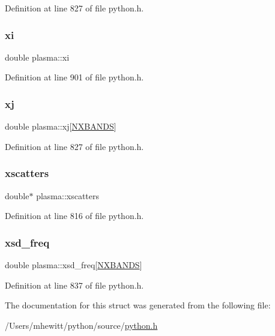 Definition at line 827 of file python.\+h.

\mbox{\label{structplasma_af8986403a916d5a9f4330ae70aa5e798}} 
\subsubsection{\texorpdfstring{xi}{xi}}
{\footnotesize\ttfamily double plasma\+::xi}



Definition at line 901 of file python.\+h.

\mbox{\label{structplasma_abded068048bfaf274478a65b26388ed5}} 
\subsubsection{\texorpdfstring{xj}{xj}}
{\footnotesize\ttfamily double plasma\+::xj\mbox{[}\hyperlink{python_8h_ac640b7fc429348ef2f6781704d3c5163}{N\+X\+B\+A\+N\+DS}\mbox{]}}



Definition at line 827 of file python.\+h.

\mbox{\label{structplasma_aba12a0eea107e923bad5f26cb012e72a}} 
\subsubsection{\texorpdfstring{xscatters}{xscatters}}
{\footnotesize\ttfamily double$\ast$ plasma\+::xscatters}



Definition at line 816 of file python.\+h.

\mbox{\label{structplasma_af6eca6f64a123edc0389b42ace886569}} 
\subsubsection{\texorpdfstring{xsd\+\_\+freq}{xsd\_freq}}
{\footnotesize\ttfamily double plasma\+::xsd\+\_\+freq\mbox{[}\hyperlink{python_8h_ac640b7fc429348ef2f6781704d3c5163}{N\+X\+B\+A\+N\+DS}\mbox{]}}



Definition at line 837 of file python.\+h.



The documentation for this struct was generated from the following file\+:\begin{DoxyCompactItemize}
\item 
/\+Users/mhewitt/python/source/\hyperlink{python_8h}{python.\+h}\end{DoxyCompactItemize}
